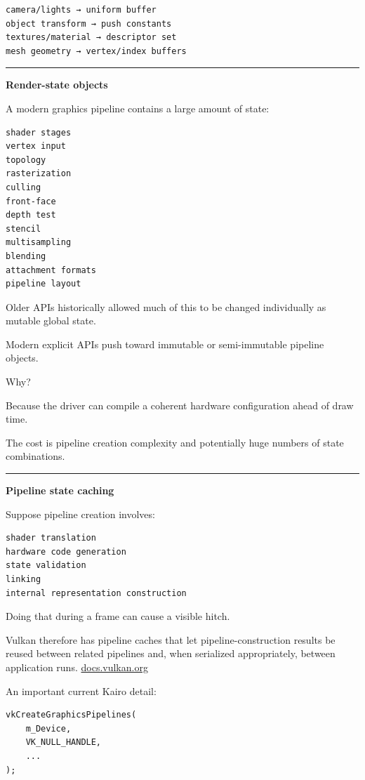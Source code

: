 \begin{verbatim}
camera/lights → uniform buffer
object transform → push constants
textures/material → descriptor set
mesh geometry → vertex/index buffers
\end{verbatim}

\begin{center}\rule{0.5\linewidth}{0.5pt}\end{center}

\textbf{Render-state objects}

A modern graphics pipeline contains a large amount of state:

\begin{verbatim}
shader stages
vertex input
topology
rasterization
culling
front-face
depth test
stencil
multisampling
blending
attachment formats
pipeline layout
\end{verbatim}

Older APIs historically allowed much of this to be changed individually as mutable global state.

Modern explicit APIs push toward immutable or semi-immutable pipeline objects.

Why?

Because the driver can compile a coherent hardware configuration ahead of draw time.

The cost is pipeline creation complexity and potentially huge numbers of state combinations.

\begin{center}\rule{0.5\linewidth}{0.5pt}\end{center}

\textbf{Pipeline state caching}

Suppose pipeline creation involves:

\begin{verbatim}
shader translation
hardware code generation
state validation
linking
internal representation construction
\end{verbatim}

Doing that during a frame can cause a visible hitch.

Vulkan therefore has pipeline caches that let pipeline-construction results be reused between related pipelines and, when serialized appropriately, between application runs. \href{https://docs.vulkan.org/spec/latest/chapters/pipelines.html?utm_source=chatgpt.com}{docs.vulkan.org}

An important current Kairo detail:

\begin{verbatim}
vkCreateGraphicsPipelines(
    m_Device,
    VK_NULL_HANDLE,
    ...
);
\end{verbatim}


